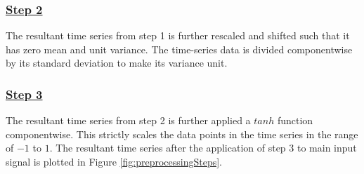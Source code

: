  
\subsubsection*{\underline{Step 2}}
   The resultant time series from  step 1  is further rescaled and shifted such that it has zero mean and unit variance. The time-series data is divided componentwise by its standard deviation to make its variance unit. 
   
\subsubsection*{\underline{Step 3}}
\indent
  The resultant time series from step 2 is further applied a $tanh$ function componentwise. This strictly scales the data points in the time series in the range of $-1$ to $1$. The resultant time series after the application of step 3 to main input signal is plotted in Figure \ref{fig:preprocessingSteps}.
  
